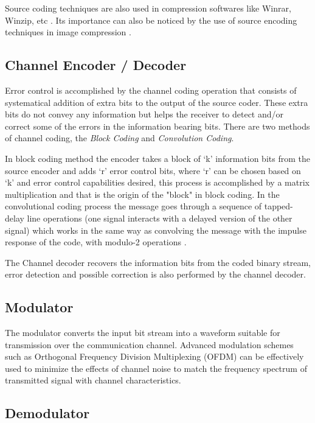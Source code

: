 Source coding techniques are also used in compression softwares like Winrar,
Winzip, etc \cite{akbook}. Its importance can also be noticed by the use of
source encoding techniques in image compression \cite{akbook}.

\subsection{Channel Encoder / Decoder}

Error control is accomplished by the channel coding operation that consists of
systematical addition of extra bits to the output of the source coder. These
extra bits do not convey any information but helps the receiver to detect and/or
correct some of the errors in the information bearing bits. There are two
methods of channel coding, the \textit{Block Coding} and \textit{Convolution
Coding}.

In block coding method the encoder takes a block of ‘k’ information bits from
the source encoder and adds ‘r’ error control bits, where ‘r’ can be chosen
based on ‘k’ and error control capabilities desired, this process is
accomplished by a matrix multiplication and that is the origin of the "block"
in block coding. In the convolutional coding process the message goes through a
sequence of tapped-delay line operations (one signal interacts with a delayed
version of the other signal) which works in the same way as convolving the
message with the impulse response of the code, with modulo-2 operations
\cite{ocw:digicomm}.

The Channel decoder recovers the information bits from the coded binary stream,
error detection and possible correction is also performed by the channel
decoder.

\subsection{Modulator}

The modulator converts the input bit stream into a waveform suitable for
transmission over the communication channel. Advanced modulation schemes such as
Orthogonal Frequency Division Multiplexing (OFDM) can be effectively used to
minimize the effects of channel noise to match the frequency spectrum of
transmitted signal with channel characteristics.

\subsection{Demodulator}

